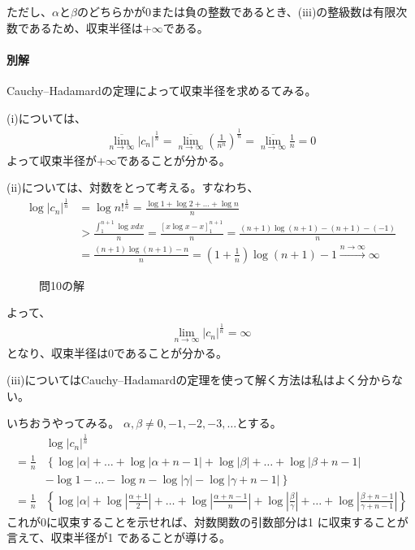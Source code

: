 ただし、$\alpha$と$\beta$のどちらかが0または負の整数であるとき、(iii)の整級数は有限次数であるため、収束半径は$+\infty$である。

\paragraph{別解}
Cauchy--Hadamardの定理によって収束半径を求めるてみる。

(i)については、
\begin{align*}
    \overline{\lim_{n\to\infty}}|c_n|^\frac{1}{n}=\overline{\lim_{n\to\infty}}\left(\frac{1}{n^n}\right)^\frac{1}{n}=\overline{\lim_{n\to\infty}}\frac{1}{n}=0
\end{align*}
よって収束半径が$+\infty$であることが分かる。

(ii)については、対数をとって考える。すなわち、
\begin{align*}
    \log |c_n|^\frac{1}{n}
   &=\log n!^\frac{1}{n}
   =\frac{\log 1 +\log 2 +\dots+\log n}{n}\\
   &>\frac{\int_{1}^{n+1}\log x dx}{n}
   =\frac{\left[x\log x -x\right]_1^{n+1}}{n}
   =\frac{(n+1)\log(n+1)-(n+1)-(-1)}{n}\\
   &=\frac{(n+1)\log(n+1)-n}{n}
   =\left(1+\frac{1}{n}\right)\log(n+1)-1
   \overset{n\longrightarrow\infty}{\longrightarrow}\infty
\end{align*}
\begin{figure}
    \centering
    \scalebox{0.6}{}
    \caption{問10の解}
\end{figure}
よって、
\begin{align*}
    \lim_{n\to\infty}|c_n|^\frac{1}{n}=\infty
\end{align*}
となり、収束半径は0であることが分かる。

(iii)についてはCauchy--Hadamardの定理を使って解く方法は私はよく分からない。

いちおうやってみる。
$\alpha, \beta\neq 0, -1,-2,-3,\dots$とする。
\begin{align*}
    &\log |c_n|^\frac{1}{n}\\
   =\frac{1}{n}
   &\left\{ 
   \log|\alpha|+\dots+\log|\alpha+n-1|
   +\log|\beta|+\dots+\log|\beta+n-1|\right.\\
   &\left.
   -\log 1-\dots-\log n 
   -\log|\gamma|-\log|\gamma+n-1| 
   \right\}\\
   =\frac{1}{n}&\left\{ \log|\alpha|+\log\left|\frac{\alpha+1}{2}\right|+\dots+\log\left|\frac{\alpha+n-1}{n}\right|
   +\log\left|\frac{\beta}{\gamma}\right|
   +\dots+\log\left|\frac{\beta+n-1}{\gamma+n-1}\right|\right\}
\end{align*}
これが0に収束することを示せれば、対数関数の引数部分は1
に収束することが言えて、収束半径が1
であることが導ける。

